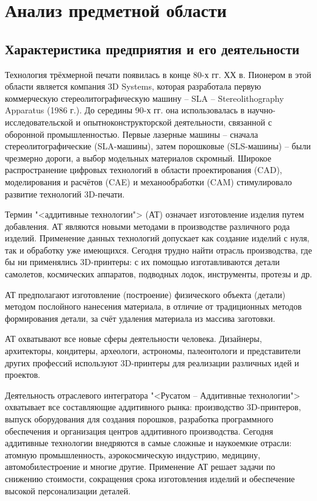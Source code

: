 \newsection
\section{Анализ предметной области}
\subsection{Характеристика предприятия и его деятельности}

Технология трёхмерной печати появилась в конце 80-х гг. ХХ в. Пионером в этой области является компания 3D Systems, которая разработала первую коммерческую стереолитографическую машину – SLA – \linebreak Stereolithography Apparatus (1986 г.). До середины 90-х гг. она использовалась в научно-исследовательской и опытноконструкторской деятельности, связанной с оборонной промышленностью. Первые лазерные машины – сначала стереолитографические (SLA-машины), затем порошковые (SLS-машины) – были чрезмерно дороги, а выбор модельных материалов скромный. Широкое распространение цифровых технологий в области проектирования (CAD), моделирования и расчётов (CAE) и механообработки (CAM) стимулировало развитие технологий 3D-печати. 

Термин "<аддитивные технологии"> (АТ) означает изготовление изделия путем добавления. АТ являются новыми методами в производстве различного рода изделий. Применение данных технологий допускает как создание изделий с нуля, так и обработку уже имеющихся. Сегодня трудно найти отрасль производства, где бы ни применялись 3D-принтеры: с их помощью изготавливаются детали самолетов, космических аппаратов, подводных лодок, инструменты, протезы и др.

АТ предполагают изготовление (построение) физического объекта (детали) методом послойного нанесения материала, в отличие от традиционных методов формирования детали, за счёт удаления материала из массива заготовки.

АТ охватывают все новые сферы деятельности человека. Дизайнеры, архитекторы, кондитеры, археологи, астрономы, палеонтологи и представители других профессий используют 3D-принтеры для реализации различных идей и проектов. 

Деятельность отраслевого интегратора "<Русатом -- Аддитивные технологии"> охватывает все составляющие аддитивного рынка: производство 3D-принтеров, выпуск оборудования для создания порошков, разработка программного обеспечения и организация центров аддитивного производства. Сегодня аддитивные технологии внедряются в самые сложные и наукоемкие отрасли: атомную промышленность, аэрокосмическую индустрию, медицину, автомобилестроение и многие другие. Применение АТ решает задачи по снижению стоимости, сокращения срока изготовления изделий и обеспечение высокой персонализации деталей.
